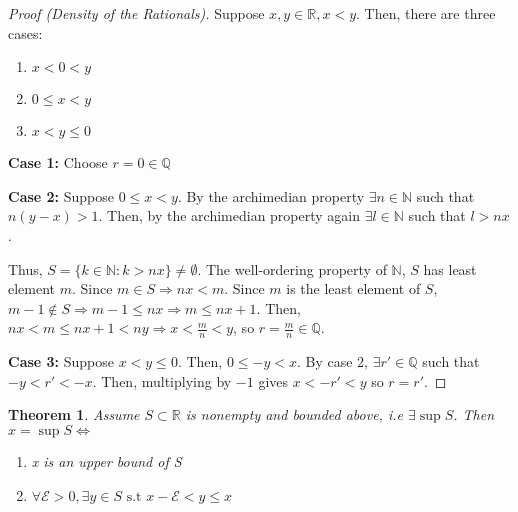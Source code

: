 \documentclass[12pt]{article}
\newtheorem{theorem}{Theorem}
\begin{document}
\begin{proof}[Proof (Density of the Rationals)]
    Suppose \(x,y \in \mathbb R, x < y\). Then, there are three cases: 
    \begin{enumerate}
        \item \(x < 0 < y\) 
        \item \(0 \leq x < y\) 
        \item \(x < y \leq 0\)
    \end{enumerate}
    \textbf{Case 1:}
    Choose \(r = 0 \in \mathbb Q\)

    \noindent 
    \textbf{Case 2:}
    Suppose \(0 \leq x < y\). By the archimedian property \(\exists n\in \mathbb N\) 
    such that \(n(y-x) > 1\). Then, by the archimedian property again 
    \(\exists l \in \mathbb N\) such that \(l > nx\). 
    
    \noindent
    Thus, \(S = \{k \in \mathbb N : k > nx\} \neq \emptyset\).
    The well-ordering property of \(\mathbb N\), \(S\) has least element \(m\).
    Since \(m \in S \Rightarrow nx < m\). Since \(m\) is the least element of 
    \(S\), \(m-1 \not\in S \Rightarrow m-1 \leq nx \Rightarrow m \leq nx + 1\).
    Then, \(nx < m \leq nx + 1 < ny \Rightarrow x < \frac{m}{n} < y\), 
    so \(r = \frac{m}{n} \in \mathbb Q\).

    \noindent 
    \textbf{Case 3: }
    Suppose \(x < y \leq 0\). Then, \(0 \leq -y < x\). 
    By case 2, \(\exists r' \in \mathbb Q\) such that \(-y < r' < -x\). 
    Then, multiplying by \(-1\) gives \(x < -r' < y\) so \(r = r'\).
\end{proof}

\begin{theorem} 
    Assume \(S \subset \mathbb R\) is nonempty and bounded above, i.e \(\exists \sup S\).
    Then \(x = \sup S \Leftrightarrow \) 
    \begin{enumerate}
        \item x is an upper bound of S
        \item \(\forall \mathcal E > 0, \exists y \in S 
            \text{ s.t } x - \mathcal E < y \leq x\)
    \end{enumerate}
\end{theorem}
\end{document}
